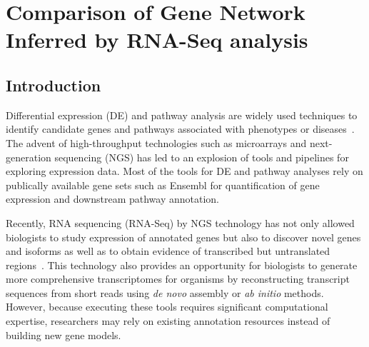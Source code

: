 \chapter{Comparison of Gene Network Inferred by RNA-Seq analysis}
\section{Introduction}

Differential expression (DE) and pathway analysis are widely used
techniques to identify candidate genes and pathways associated with
phenotypes or diseases~\cite{smith2011systems,beane2011characterizing,
  li2012rna}.  The advent of high-throughput technologies such as
microarrays and next-generation sequencing (NGS) has led to an
explosion of tools and pipelines for exploring expression data.  Most
of the tools for DE and pathway analyses rely on publically
available gene sets such as Ensembl for quantification of gene
expression and downstream pathway annotation.


Recently, RNA sequencing (RNA-Seq) by NGS technology has not
only allowed biologists to study expression of annotated
genes but also to discover novel genes and isoforms as well
as to obtain evidence of transcribed but untranslated
regions~\cite{pickrell2010understanding,
lu2010function,otto2010new,raghavachari2012systematic}.
This technology also provides an opportunity for biologists
to generate more comprehensive transcriptomes for organisms
by reconstructing transcript sequences from short reads
using \textit{de novo} assembly or \textit{ab initio}
methods.  However, because executing these tools requires
significant computational expertise, researchers may rely on
existing annotation resources instead of building new gene
models.

